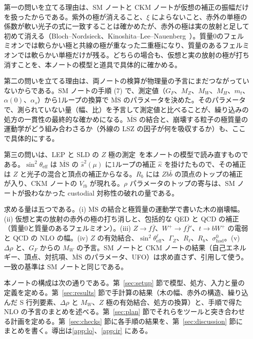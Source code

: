 \documentclass[a4paper,10pt]{ltjsarticle}
\newcommand{\MSbar}{\overline{\mathrm{MS}}}
\begin{document}
第一の問いを立てる理由は、SM ノートと CKM ノートが仮想の補正の振幅だけを扱ったからである。紫外の極が消えること、$\xi$ によらないこと、赤外の単極の係数が軟い光子の式に一致することは確かめたが、赤外の極は実の放射と足して初めて消える（Bloch--Nordsieck、Kinoshita--Lee--Nauenberg~\cite{bn37,kinoshita62,ln64}）。質量0のフェルミオンでは軟らかい極と共線の極が重なった二重極になり、質量のあるフェルミオンでは軟らかい単極だけが残る。どちらの場合も、仮想と実の放射の極が打ち消すことを、本ノートの模型と道具で具体的に確かめる。

第二の問いを立てる理由は、両ノートの検算が物理量の予言にまだつながっていないからである。SM ノートの手順 (7) で、測定値（$G_F$、$M_Z$、$M_W$、$M_H$、$m_t$、$\alpha(0)$、$\alpha_s$）から1ループの換算で $\MSbar$ のパラメータを決めた。そのパラメータで、測られていない量（幅、比）を予言して測定値と比べることが、繰り込みの処方の一貫性の最終的な確かめになる。$\MSbar$ の結合と、崩壊する粒子の極質量の運動学がどう組み合わさるか（外線の LSZ の因子が何を吸収するか）も、ここで具体的にする。

第三の問いは、LEP と SLD の $Z$ 極の測定~\cite{lepewwg06}を本ノートの模型で読み直すものである。$\sin^2\theta_{\mathrm{eff}}$ は $\MSbar$ の $\hat s^2(\mu)$ に1ループの補正 $\hat\kappa$ を掛けたもので、その補正は $Z$ と光子の混合と頂点の補正からなる。$R_b$ には $Z b\bar b$ の頂点のトップの補正が入り、CKM ノートの $V_{tb}$ が現れる。$\rho$ パラメータのトップの寄与は、SM ノートが扱わなかった custodial 対称性の破れの量である。

求める量は五つである。(i) $\MSbar$ の結合と極質量の運動学で書いた木の崩壊幅。(ii) 仮想と実の放射の赤外の極の打ち消しと、包括的な QED と QCD の補正（質量0と質量のあるフェルミオン）。(iii) $Z\to f\bar f$、$W^+\to f\bar f'$、$t\to bW^+$ の電弱と QCD の NLO の幅。(iv) $Z$ の有効結合、$\sin^2\theta_{\mathrm{eff}}^\ell$、$\Gamma_Z$、$R_\ell$、$R_b$、$\sigma^0_{\mathrm{had}}$。(v) $\Delta\rho$ と、$G_F$ からの $M_W$ の予言。SM ノートと CKM ノートの結果（自己エネルギー、頂点、対抗項、$\MSbar$ のパラメータ、UFO）は求め直さず、引用して使う。一致の基準は SM ノートと同じである。

本ノートの構成は次の通りである。第~\ref{sec:setup} 節で模型、処方、入力と量の定義を定める。第~\ref{sec:results} 節で手計算の結果（木の幅、赤外の構造、繰り込んだ S 行列要素、$\Delta\rho$ と $M_W$、$Z$ 極の有効結合、処方の換算）と、手順で得た NLO の予言のまとめを述べる。第~\ref{sec:plan} 節でそれらをツールと突き合わせる計画を定める。第~\ref{sec:checks} 節に各手順の結果を、第~\ref{sec:discussion} 節にまとめを書く。導出は\ref{app:lo}、\ref{app:ir} にある。
\end{document}
